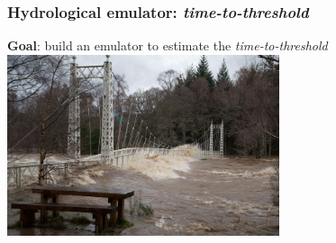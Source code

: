 \documentclass[xcolor=dvipsnames, USenglish]{beamer}  %
\begin{document}
  \begin{frame}
    \frametitle{Hydrological emulator: \emph{time-to-threshold}}
    \textbf{Goal}: build an emulator to estimate the \emph{time-to-threshold}\\
    \vfill
    \centering
    \includegraphics[width=0.6\textwidth]{img/flood_bridge.jpg}
  \end{frame}
\end{document}
